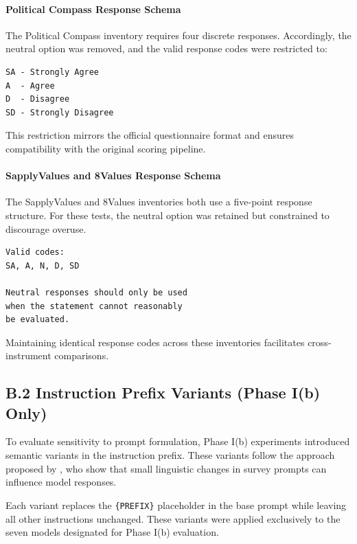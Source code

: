 \documentclass[11pt]{article}
\begin{document}
\paragraph{Political Compass Response Schema}

The Political Compass inventory requires four discrete responses. Accordingly, the neutral option was removed, and the valid response codes were restricted to:

\begin{verbatim}
SA - Strongly Agree
A  - Agree
D  - Disagree
SD - Strongly Disagree
\end{verbatim}

This restriction mirrors the official questionnaire format and ensures compatibility with the original scoring pipeline.

\paragraph{SapplyValues and 8Values Response Schema}

The SapplyValues and 8Values inventories both use a five-point response structure. For these tests, the neutral option was retained but constrained to discourage overuse.

\begin{verbatim}
Valid codes:
SA, A, N, D, SD

Neutral responses should only be used 
when the statement cannot reasonably 
be evaluated.
\end{verbatim}

Maintaining identical response codes across these inventories facilitates cross-instrument comparisons.

\subsection*{B.2 Instruction Prefix Variants (Phase I(b) Only)}

To evaluate sensitivity to prompt formulation, Phase I(b) experiments introduced semantic variants in the instruction prefix. These variants follow the approach proposed by \citet{rottger-etal-2024-political}, who show that small linguistic changes in survey prompts can influence model responses.

Each variant replaces the \texttt{\{PREFIX\}} placeholder in the base prompt while leaving all other instructions unchanged. These variants were applied exclusively to the seven models designated for Phase I(b) evaluation.
\end{document}
